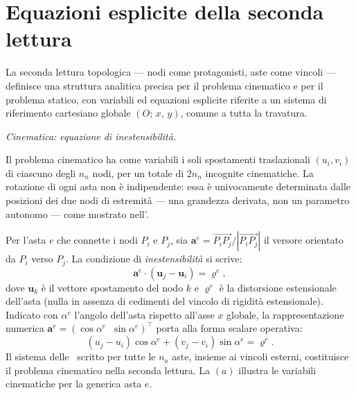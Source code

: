 \section{Equazioni esplicite della seconda lettura}
\label{sec:equazioni_seconda_lettura}



La seconda lettura topologica --- nodi come protagonisti,
aste come vincoli --- definisce una struttura analitica
precisa per il problema cinematico e per il problema
statico, con variabili ed equazioni esplicite riferite
a un sistema di riferimento cartesiano globale
$(O;\, x,\, y)$, comune a tutta la travatura.

\noindent\textit{Cinematica: equazione di inestensibilità.}
\label{subsec:inestensibilita}

Il problema cinematico ha come variabili i soli
spostamenti traslazionali $(u_i, v_i)$ di ciascuno
degli $n_n$ nodi, per un totale di $2n_n$ incognite
cinematiche. La rotazione di ogni asta non è
indipendente: essa è univocamente determinata dalle
posizioni dei due nodi di estremità --- una grandezza
derivata, non un parametro autonomo --- come mostrato
nell'.

Per l'asta $e$ che connette i nodi $P_i$ e $P_j$,
sia $\mathbf{a}^e = \overrightarrow{P_iP_j}/|\overrightarrow{P_iP_j}|$
il versore orientato da $P_i$ verso $P_j$.
La condizione di \emph{inestensibilità} si scrive:
\begin{equation}\label{eq:inestensibilita}
	\mathbf{a}^e \cdot (\mathbf{u}_j - \mathbf{u}_i) = \varrho^e,
\end{equation}
dove $\mathbf{u}_k$ è il vettore spostamento del nodo $k$
e $\varrho^e$ è la distorsione estensionale dell'asta
(nulla in assenza di cedimenti del vincolo di rigidità
estensionale). Indicato con $\alpha^e$ l'angolo dell'asta
rispetto all'asse $x$ globale, la rappresentazione numerica
$\bm{a}^e = (\cos\alpha^e\;\;\sin\alpha^e)^\top$
porta alla forma scalare operativa:
\begin{equation}\label{eq:inest_scalare}
	(u_j - u_i)\cos\alpha^e + (v_j - v_i)\sin\alpha^e = \varrho^e.
\end{equation}
Il sistema delle~ scritto
per tutte le $n_a$ aste, insieme ai vincoli esterni,
costituisce il problema cinematico nella seconda lettura.
La $(a)$ illustra
le variabili cinematiche per la generica asta $e$.


